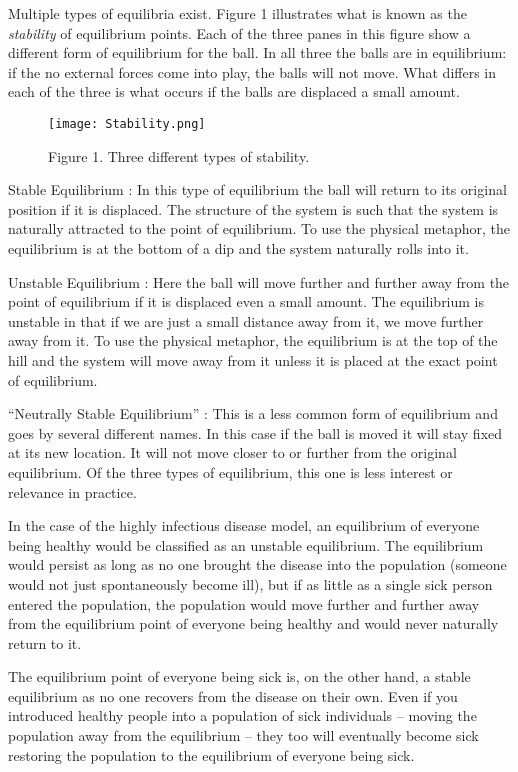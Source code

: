 \documentclass[]{memoir}
\let\Oldincludegraphics\includegraphics
\renewcommand{\includegraphics}[1]{\Oldincludegraphics[max size={\textwidth}{\textheight}]{#1}}
\begin{document}
Multiple types of equilibria exist. Figure 1 illustrates what is known
as the \emph{stability} of equilibrium points. Each of the three panes
in this figure show a different form of equilibrium for the ball. In all
three the balls are in equilibrium: if the no external forces come into
play, the balls will not move. What differs in each of the three is what
occurs if the balls are displaced a small amount.

\begin{figure}[htbp]
\centering
\texttt{[image: Stability.png]}
\caption{Figure 1. Three different types of stability.}
\end{figure}

Stable Equilibrium : In this type of equilibrium the ball will return to
its original position if it is displaced. The structure of the system is
such that the system is naturally attracted to the point of equilibrium.
To use the physical metaphor, the equilibrium is at the bottom of a dip
and the system naturally rolls into it.

Unstable Equilibrium : Here the ball will move further and further away
from the point of equilibrium if it is displaced even a small amount.
The equilibrium is unstable in that if we are just a small distance away
from it, we move further away from it. To use the physical metaphor, the
equilibrium is at the top of the hill and the system will move away from
it unless it is placed at the exact point of equilibrium.

``Neutrally Stable Equilibrium'' : This is a less common form of
equilibrium and goes by several different names. In this case if the
ball is moved it will stay fixed at its new location. It will not move
closer to or further from the original equilibrium. Of the three types
of equilibrium, this one is less interest or relevance in practice.

In the case of the highly infectious disease model, an equilibrium of
everyone being healthy would be classified as an unstable equilibrium.
The equilibrium would persist as long as no one brought the disease into
the population (someone would not just spontaneously become ill), but if
as little as a single sick person entered the population, the population
would move further and further away from the equilibrium point of
everyone being healthy and would never naturally return to it.

The equilibrium point of everyone being sick is, on the other hand, a
stable equilibrium as no one recovers from the disease on their own.
Even if you introduced healthy people into a population of sick
individuals -- moving the population away from the equilibrium -- they
too will eventually become sick restoring the population to the
equilibrium of everyone being sick.
\end{document}
